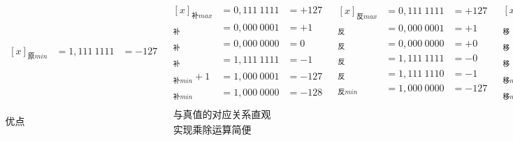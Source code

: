 $$\begin{array}{|l|l|l|l|l|}
\begin{array}{lll}
            [x]_{\text{原}min} & = 1,111 \ 1111 & = -127
        \end{array}   &
        \begin{array}{lll}
            [x]_{\text{补}max}   & = 0,111 \ 1111 & = +127 \\
            [+1]_\text{补}       & = 0,000 \ 0001 & =+1    \\
            [0]_\text{补}        & = 0,000 \ 0000 & =0     \\
            [-1]_\text{补}       & = 1,111 \ 1111 & =-1    \\
            [x]_{\text{补}min}+1 & = 1,000 \ 0001 & = -127 \\
            [x]_{\text{补}min}   & = 1,000 \ 0000 & = -128
        \end{array} &
        \begin{array}{lll}
            [x]_{\text{反}max} & = 0,111 \ 1111 & = +127 \\
            [+1]_\text{反}     & = 0,000 \ 0001 & =+1    \\
            [+0]_\text{反}     & = 0,000 \ 0000 & =+0    \\
            [-0]_\text{反}     & = 1,111 \ 1111 & =-0    \\
            [-1]_\text{反}     & = 1,111 \ 1110 & =-1    \\
            [x]_{\text{反}min} & = 1,000 \ 0000 & = -127 \\
        \end{array}   &
        \begin{array}{lll}
            [x]_{\text{移}max}   & = 1,111 \ 1111 & = +127 \\
            [+1]_\text{移}       & = 1,000 \ 0001 & =+1    \\
            [0]_\text{移}        & = 1,000 \ 0000 & =0
            \\
            [-1]_\text{移}       & = 0,111 \ 1111 & =-1
            \\
            [x]_{\text{移}min}+1 & = 0,000 \ 0001 & =-127
            \\
            [x]_{\text{移}min}   & = 0,000 \ 0000 & = -128
        \end{array}
        \\
        \hline
        \text{优点}                                                      &
        \begin{array}{l}
            \text{与真值的对应关系直观} \\
            \text{实现乘除运算简便}
        \end{array}                                           &

\end{array}$$
